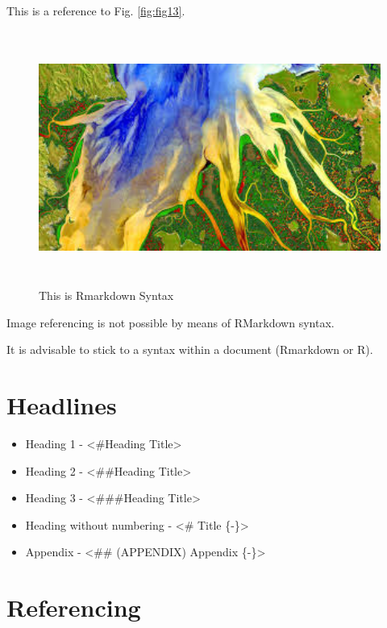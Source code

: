 \documentclass[]{book}
\providecommand{\tightlist}{%
  \setlength{\itemsep}{0pt}\setlength{\parskip}{0pt}}
\theoremstyle{definition}
\theoremstyle{definition}
\theoremstyle{definition}
\theoremstyle{remark}
\let\BeginKnitrBlock\begin \let\EndKnitrBlock\end
\begin{document}
This is a reference to Fig. \ref{fig:fig13}.

\begin{figure}
\centering
\includegraphics[width=4.79167in,height=3.28125in]{images/example-images2.jpg}
\caption{This is Rmarkdown Syntax}
\end{figure}

\BeginKnitrBlock{rmdcaution}
Image referencing is not possible by means of RMarkdown syntax.
\EndKnitrBlock{rmdcaution}

\BeginKnitrBlock{rmdtip}
It is advisable to stick to a syntax within a document (Rmarkdown or R).
\EndKnitrBlock{rmdtip}

\section{Headlines}\label{headlines}

\begin{itemize}
\tightlist
\item
  Heading 1 - \textless{}\#Heading Title\textgreater{}
\item
  Heading 2 - \textless{}\#\#Heading Title\textgreater{}
\item
  Heading 3 - \textless{}\#\#\#Heading Title\textgreater{}
\item
  Heading without numbering - \textless{}\# Title \{-\}\textgreater{}
\item
  Appendix - \textless{}\#\# (APPENDIX) Appendix \{-\}\textgreater{}
\end{itemize}

\section{Referencing}\label{referencing}
\end{document}
